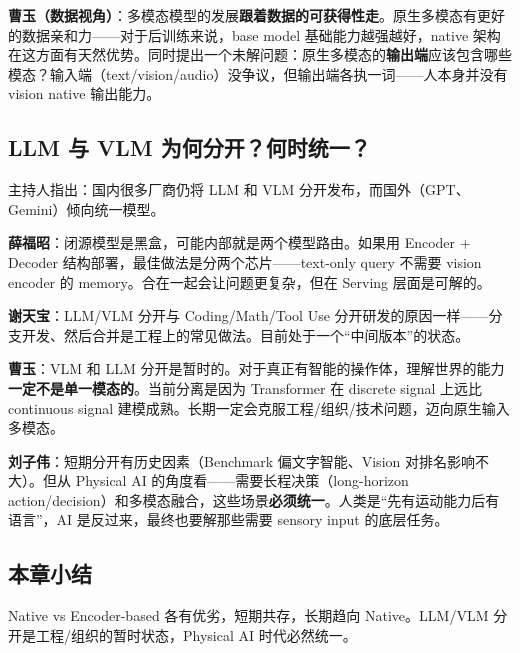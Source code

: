 \textbf{曹玉（数据视角）}：多模态模型的发展\textbf{跟着数据的可获得性走}。原生多模态有更好的数据亲和力——对于后训练来说，base model 基础能力越强越好，native 架构在这方面有天然优势。同时提出一个未解问题：原生多模态的\textbf{输出端}应该包含哪些模态？输入端（text/vision/audio）没争议，但输出端各执一词——人本身并没有 vision native 输出能力。

\subsection{LLM 与 VLM 为何分开？何时统一？}

主持人指出：国内很多厂商仍将 LLM 和 VLM 分开发布，而国外（GPT、Gemini）倾向统一模型。

\textbf{薛福昭}：闭源模型是黑盒，可能内部就是两个模型路由。如果用 Encoder + Decoder 结构部署，最佳做法是分两个芯片——text-only query 不需要 vision encoder 的 memory。合在一起会让问题更复杂，但在 Serving 层面是可解的。

\textbf{谢天宝}：LLM/VLM 分开与 Coding/Math/Tool Use 分开研发的原因一样——分支开发、然后合并是工程上的常见做法。目前处于一个``中间版本''的状态。

\textbf{曹玉}：VLM 和 LLM 分开是暂时的。对于真正有智能的操作体，理解世界的能力\textbf{一定不是单一模态的}。当前分离是因为 Transformer 在 discrete signal 上远比 continuous signal 建模成熟。长期一定会克服工程/组织/技术问题，迈向原生输入多模态。

\textbf{刘子伟}：短期分开有历史因素（Benchmark 偏文字智能、Vision 对排名影响不大）。但从 Physical AI 的角度看——需要长程决策（long-horizon action/decision）和多模态融合，这些场景\textbf{必须统一}。人类是``先有运动能力后有语言''，AI 是反过来，最终也要解那些需要 sensory input 的底层任务。

\subsection{本章小结}
Native vs Encoder-based 各有优劣，短期共存，长期趋向 Native。LLM/VLM 分开是工程/组织的暂时状态，Physical AI 时代必然统一。

